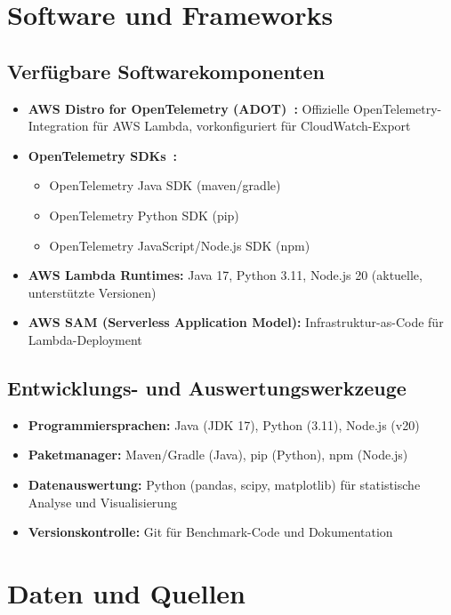 \section{Software und Frameworks}

\subsection{Verfügbare Softwarekomponenten}

\begin{itemize}
    \item \textbf{AWS Distro for OpenTelemetry (ADOT)~\cite{AWSLambdaBestPractices}:} Offizielle OpenTelemetry-Integration für AWS Lambda, vorkonfiguriert für CloudWatch-Export
    \item \textbf{OpenTelemetry SDKs~\cite{OpenTelemetryDocs}:}
    \begin{itemize}
        \item OpenTelemetry Java SDK (maven/gradle)
        \item OpenTelemetry Python SDK (pip)
        \item OpenTelemetry JavaScript/Node.js SDK (npm)
    \end{itemize}
    \item \textbf{AWS Lambda Runtimes:} Java 17, Python 3.11, Node.js 20 (aktuelle, unterstützte Versionen)
    \item \textbf{AWS SAM (Serverless Application Model):} Infrastruktur-as-Code für Lambda-Deployment
\end{itemize}

\subsection{Entwicklungs- und Auswertungswerkzeuge}

\begin{itemize}
    \item \textbf{Programmiersprachen:} Java (JDK 17), Python (3.11), Node.js (v20)
    \item \textbf{Paketmanager:} Maven/Gradle (Java), pip (Python), npm (Node.js)
    \item \textbf{Datenauswertung:} Python (pandas, scipy, matplotlib) für statistische Analyse und Visualisierung
    \item \textbf{Versionskontrolle:} Git für Benchmark-Code und Dokumentation
\end{itemize}

\section{Daten und Quellen}


